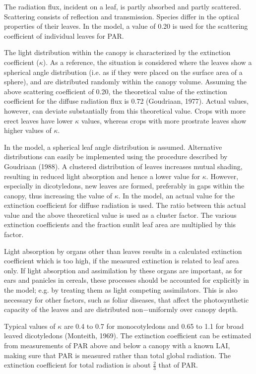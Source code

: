The radiation flux, incident on a leaf, is partly absorbed and partly scattered. Scattering
consists of reflection and transmission. Species differ in the optical properties of their
leaves. In the model, a value of 0.20 is used for the scattering coefficient of individual 
leaves for PAR.

The light distribution within the canopy is characterized by the extinction coefficient ($\kappa$).
As a reference, the situation is considered where the leaves show a spherical angle
distribution (i.e. as if they were placed on the surface area of a sphere), and are 
distributed randomly within the canopy volume. Assuming the above scattering coefficient of
0.20, the theoretical value of the extinction coefficient for the diffuse radiation flux is
0.72 (Goudriaan, 1977). Actual values, however, can deviate substantially from this
theoretical value. Crops with more erect leaves have lower $\kappa$ values, whereas crops with
more prostrate leaves show higher values of $\kappa$. 

In the model, a spherical leaf angle
distribution is assumed. Alternative distributions can easily be implemented using the
procedure described by Goudriaan (1988). A clustered distribution of leaves increases
mutual shading, resulting in reduced light absorption and hence a lower value for $\kappa$.
However, especially in dicotyledons, new leaves are formed, preferably in gaps within the
canopy, thus increasing the value of $\kappa$. In the model, an actual value for the extinction
coefficient for diffuse radiation is used. The ratio between this actual value and the above
theoretical value is used as a cluster factor. The various extinction coefficients and the
fraction sunlit leaf area are multiplied by this factor.

Light absorption by organs other than leaves results in a calculated extinction coefficient
which is too high, if the measured extinction is related to leaf area only. If light 
absorption and assimilation by these organs are important, as for ears and panicles in cereals,
these processes should be accounted for explicitly in the model; e.g. by treating them as
light competing assimilators. This is also necessary for other factors, such as foliar
diseases, that affect the photosynthetic capacity of the leaves and are distributed
non$-$uniformly over canopy depth.

Typical values of $\kappa$ are 0.4 to 0.7 for monocotyledons and 0.65 to 1.1 for broad leaved
dicotyledons (Monteith, 1969). The extinction coefficient can be estimated from 
measurements of PAR above and below a canopy with a known LAI, making sure that PAR is
measured rather than total global radiation. The extinction coefficient for total radiation is
about $\frac{2}{3}$ that of PAR. 

